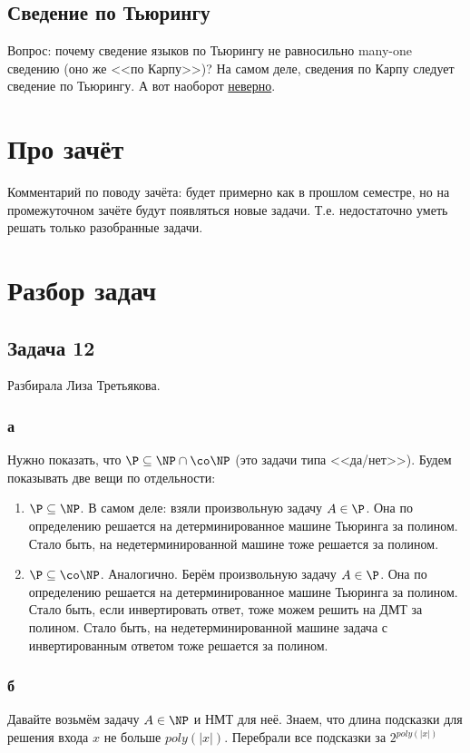 \subsection{Сведение по Тьюрингу}
	Вопрос: почему сведение языков по Тьюрингу не равносильно many-one сведению (оно же <<по Карпу>>)?
	На самом деле, сведения по Карпу следует сведение по Тьюрингу.
	А вот наоборот \hyperref[task_14_rem_turing]{неверно}.

\section{Про зачёт}
	Комментарий по поводу зачёта: будет примерно как в прошлом семестре, но на промежуточном
	зачёте будут появляться новые задачи.
	Т.е. недостаточно уметь решать только разобранные задачи.

\section{Разбор задач}
\subsection{Задача 12}
	Разбирала Лиза Третьякова.

	\subsubsection{а}
		Нужно показать, что $\P \subseteq \NP \cap \co\NP$ (это задачи типа <<да/нет>>).
		Будем показывать две вещи по отдельности:
		\begin{enumerate}
			\item
				$\P \subseteq \NP$.
				В самом деле: взяли произвольную задачу $A \in \P$.
				Она по определению решается на детерминированное машине Тьюринга за полином.
				Стало быть, на недетерминированной машине тоже решается за полином.
			\item
				$\P \subseteq \co\NP$.
				Аналогично.
				Берём произвольную задачу $A \in \P$.
				Она по определению решается на детерминированное машине Тьюринга за полином.
				Стало быть, если инвертировать ответ, тоже можем решить на ДМТ за полином.
				Стало быть, на недетерминированной машине задача с инвертированным ответом тоже решается за полином.
		\end{enumerate}

	\subsubsection{б}
		Давайте возьмём задачу $A \in \NP$ и НМТ для неё.
		Знаем, что длина подсказки для решения входа $x$ не больше $poly(|x|)$.
		Перебрали все подсказки за $2^{poly(|x|)}$


